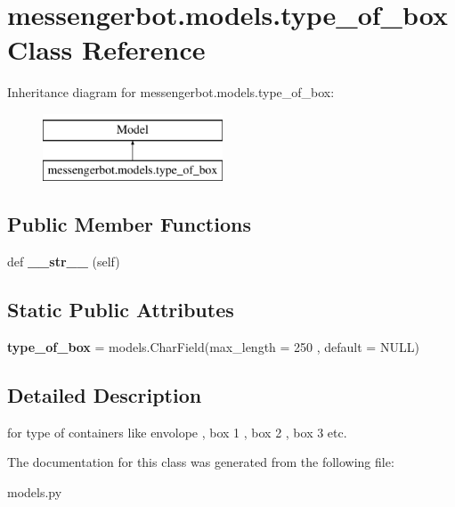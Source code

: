 \hypertarget{classmessengerbot_1_1models_1_1type__of__box}{}\section{messengerbot.\+models.\+type\+\_\+of\+\_\+box Class Reference}
\label{classmessengerbot_1_1models_1_1type__of__box}
Inheritance diagram for messengerbot.\+models.\+type\+\_\+of\+\_\+box\+:\begin{figure}[H]
\begin{center}
\leavevmode
\includegraphics[height=2.000000cm]{classmessengerbot_1_1models_1_1type__of__box}
\end{center}
\end{figure}
\subsection*{Public Member Functions}
\begin{DoxyCompactItemize}
\item 
\mbox{\label{classmessengerbot_1_1models_1_1type__of__box_ab6bfc5fff4cd1d8144d037d559cbb932}} 
def {\bfseries \+\_\+\+\_\+str\+\_\+\+\_\+} (self)
\end{DoxyCompactItemize}
\subsection*{Static Public Attributes}
\begin{DoxyCompactItemize}
\item 
\mbox{\label{classmessengerbot_1_1models_1_1type__of__box_a42410a03c6abf8fe27bb9b21ba3abe42}} 
{\bfseries type\+\_\+of\+\_\+box} = models.\+Char\+Field(max\+\_\+length = 250 , default = \textquotesingle{}N\+U\+LL\textquotesingle{})
\end{DoxyCompactItemize}


\subsection{Detailed Description}
\begin{DoxyVerb}for type of containers like envolope , box 1 , box 2 , box 3 etc.\end{DoxyVerb}
 

The documentation for this class was generated from the following file\+:\begin{DoxyCompactItemize}
\item 
models.\+py\end{DoxyCompactItemize}
